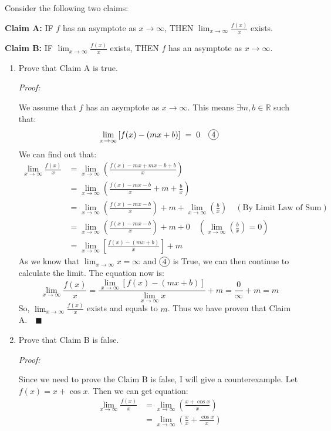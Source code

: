 \documentclass[12pt]{exam}
\newcommand*\circled[1]{\tikz[baseline=(char.base)]{
    \node[shape=circle, draw, inner sep=1pt, 
        minimum height=12pt] (char) {#1};}}
\newcommand {\DS} [1] {${\displaystyle #1}$}
\newcommand{\vv}{\vspace{.1cm}}
\newcommand{\R}{\mathbb{R}}
\begin{document}
\begin{enumerate}
Consider the following two claims:	
			\begin{center}
				{\bf Claim A:} \quad \quad
					IF $f$ has an asymptote as $x \to \infty$,  \quad
					THEN \DS{\lim_{x \to \infty} \frac{f(x)}{x}} exists.
				
				{\bf Claim B:} \quad \quad 		
					IF \DS{\lim_{x \to \infty} \frac{f(x)}{x}} exists, \quad
					THEN $f$ has an asymptote as $x \to \infty$.
			\end{center}
	\begin{enumerate}
		\item Prove that Claim A is true.
		
		\vv
		
		\emph{Proof:}
		
		\vv
		
		We assume that $f$ has an asymptote as $x \to \infty$. This means $\exists m,b\in\R$ such that:
		$$
		    \lim_{x \to \infty} \left[ f(x) - \left( mx + b \right) \right] \; = \; 0 \quad\circled{4}
		$$
		We can find out that:
		\begin{align*}
		    \lim_{x \to \infty} \frac{f(x)}{x}
		    &=\lim_{x \to \infty} (\frac{f(x)-mx+mx-b+b}{x})\\
		    &=\lim_{x \to \infty} (\frac{f(x)-mx-b}{x}+m+\frac{b}{x})\\
		    &=\lim_{x \to \infty}(\frac{f(x)-mx-b}{x})+m+\lim_{x \to \infty}(\frac{b}{x}) \quad(\mbox{By Limit Law of Sum})\\
		    &=\lim_{x \to \infty}(\frac{f(x)-mx-b}{x})+m+0\quad(\lim_{x \to \infty}(\frac{b}{x})=0)\\
		    &=\lim_{x \to \infty}[\frac{f(x)-(mx+b)}{x}]+m
		\end{align*}
		As we know that $\lim_{x \to \infty}x=\infty$ and $\circled{4}$ is True, we can then continue to calculate the limit. The equation now is:
		$$
		    \lim_{x \to \infty} \frac{f(x)}{x}=\frac{\lim_{x \to \infty}[f(x)-(mx+b)]}{\lim_{x \to \infty}x}+m=\frac{0}{\infty}+m=m
		$$
		So, $\lim_{x \to \infty} \frac{f(x)}{x}$ exists and equals to $m$. Thus we have proven that Claim A.$\quad\blacksquare$
		
		\newpage
		
		\item Prove that Claim B is false.
		
		\vv
		
		\emph{Proof:}
		
		\vv
		
		Since we need to prove the Claim B is false, I will give a counterexample. Let $f(x)=x+\cos{x}.$
		Then we can get equation:
		\begin{align*}
		    \lim_{x \to \infty} \frac{f(x)}{x}&=\lim_{x \to \infty}(\frac{x+\cos{x}}{x})\\
		    &=\lim_{x \to \infty}(\frac{x}{x}+\frac{\cos{x}}{x})
		\end{align*}
		

\end{enumerate}
\end{enumerate}
\end{document}
